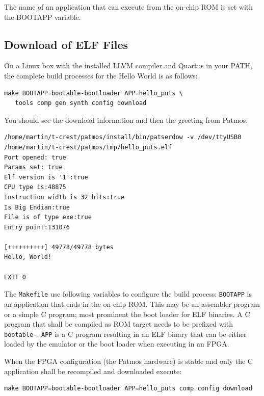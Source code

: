 \documentclass[a4paper,fontsize=10pt,twoside,DIV15,BCOR12mm,headinclude=true,footinclude=false,pagesize,bibtotoc]{scrbook}
\newcommand{\code}[1]{{\texttt{#1}}}
\begin{document}
The name of an application that can execute from the on-chip ROM is set
with the BOOTAPP variable.

\subsection{Download of ELF Files}
\label{sec:elf:files}

On a Linux box with the installed LLVM compiler and Quartus in your PATH,
the complete build processes for the Hello World is as follows:

\begin{verbatim}
make BOOTAPP=bootable-bootloader APP=hello_puts \
   tools comp gen synth config download
\end{verbatim}

You should see the download information and then the greeting from Patmos:

\begin{verbatim}
/home/martin/t-crest/patmos/install/bin/patserdow -v /dev/ttyUSB0 /home/martin/t-crest/patmos/tmp/hello_puts.elf
Port opened: true
Params set: true
Elf version is '1':true
CPU type is:48875
Instruction width is 32 bits:true
Is Big Endian:true
File is of type exe:true
Entry point:131076

[++++++++++] 49778/49778 bytes
Hello, World!

EXIT 0
\end{verbatim}

The \code{Makefile} use following variables to configure the build process:
\code{BOOTAPP} is an application that ends in the on-chip ROM. This may
be an assembler program or a simple C program;
most prominent the boot loader for ELF binaries.
A C program that shall be compiled as ROM target needs to be prefixed
with \code{bootable-}.
\code{APP} is a C program resulting in an ELF binary that can be either
loaded by the emulator or the boot loader when executing in an FPGA.

When the FPGA configuration (the Patmos hardware) is stable and only
the C application shall be recompiled and downloaded execute:

\begin{verbatim}
make BOOTAPP=bootable-bootloader APP=hello_puts comp config download
\end{verbatim}
\end{document}
